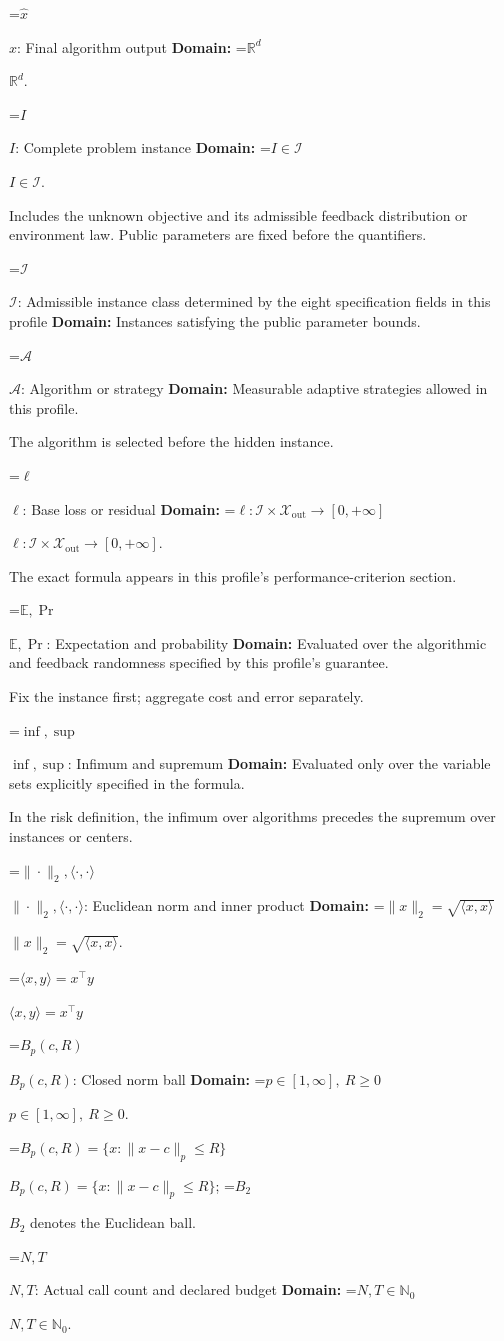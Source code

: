 \documentclass[10pt,a4paper]{article}
\newcommand{\AtlasMath}[1]{\par\begingroup\centering\setbox0=\hbox{$\displaystyle #1$}\ifdim\wd0>1.4\linewidth\typeout{ATLAS WIDE FORMULA: \the\wd0}\fi\ifdim\wd0>\linewidth\resizebox{\linewidth}{!}{\box0}\else\box0\fi\par\endgroup}
\newcommand{\AtlasInlineMath}[1]{\begingroup\setbox0=\hbox{$#1$}\ifdim\wd0>.4\linewidth\endgroup\AtlasMath{#1}\else\endgroup$#1$\fi}
\begin{document}
\AtlasInlineMath{\widehat{x}}: Final algorithm output \textbf{Domain:} \AtlasInlineMath{\mathbb{R}^d}.

\AtlasInlineMath{I}: Complete problem instance \textbf{Domain:} \AtlasInlineMath{I\in\mathcal{I}}.

Includes the unknown objective and its admissible feedback distribution or environment law. Public parameters are fixed before the quantifiers.

\AtlasInlineMath{\mathcal{I}}: Admissible instance class determined by the eight specification fields in this profile \textbf{Domain:} Instances satisfying the public parameter bounds.

\AtlasInlineMath{\mathcal{A}}: Algorithm or strategy \textbf{Domain:} Measurable adaptive strategies allowed in this profile.

The algorithm is selected before the hidden instance.

\AtlasInlineMath{\ell}: Base loss or residual \textbf{Domain:} \AtlasInlineMath{\ell:\mathcal{I}\times\mathcal{X}_{\mathrm{out}}\to[0,+\infty]}.

The exact formula appears in this profile's performance-criterion section.

\AtlasInlineMath{\mathbb{E},\Pr}: Expectation and probability \textbf{Domain:} Evaluated over the algorithmic and feedback randomness specified by this profile's guarantee.

Fix the instance first; aggregate cost and error separately.

\AtlasInlineMath{\inf,\sup}: Infimum and supremum \textbf{Domain:} Evaluated only over the variable sets explicitly specified in the formula.

In the risk definition, the infimum over algorithms precedes the supremum over instances or centers.

\AtlasInlineMath{\|\cdot\|_2,\langle\cdot,\cdot\rangle}: Euclidean norm and inner product \textbf{Domain:} \AtlasInlineMath{\|x\|_2=\sqrt{\langle x,x\rangle}}.

\AtlasInlineMath{\langle x,y\rangle=x^\top y}

\AtlasInlineMath{B_p(c,R)}: Closed norm ball \textbf{Domain:} \AtlasInlineMath{p\in[1,\infty],\ R\ge0}.

\AtlasInlineMath{B_p(c,R)=\{x:\|x-c\|_p\le R\}}; \AtlasInlineMath{B_2} denotes the Euclidean ball.

\AtlasInlineMath{N,T}: Actual call count and declared budget \textbf{Domain:} \AtlasInlineMath{N,T\in\mathbb{N}_0}.
\end{document}
